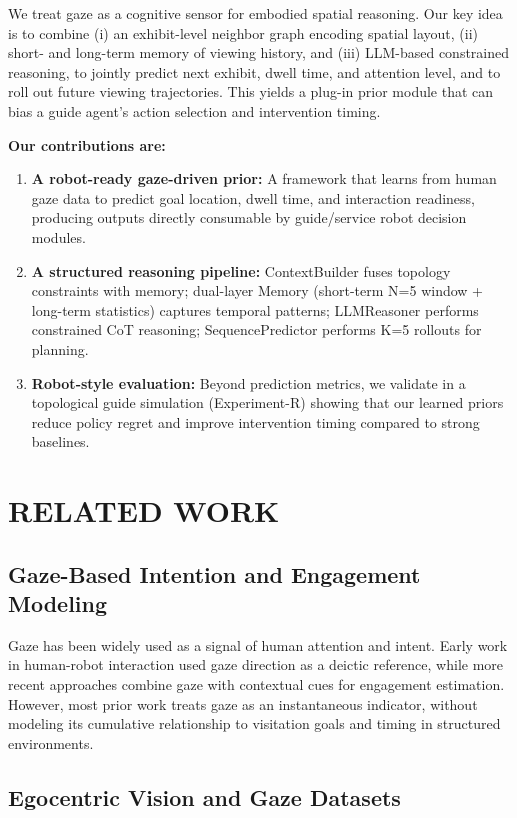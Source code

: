 \documentclass[letterpaper]{article}
\begin{document}
We treat gaze as a cognitive sensor for embodied spatial reasoning. Our key idea is to combine (i) an exhibit-level neighbor graph encoding spatial layout, (ii) short- and long-term memory of viewing history, and (iii) LLM-based constrained reasoning, to jointly predict next exhibit, dwell time, and attention level, and to roll out future viewing trajectories. This yields a plug-in prior module that can bias a guide agent's action selection and intervention timing.

\textbf{Our contributions are:}

\begin{enumerate}
    \item \textbf{A robot-ready gaze-driven prior:} A framework that learns from human gaze data to predict goal location, dwell time, and interaction readiness, producing outputs directly consumable by guide/service robot decision modules.
    \item \textbf{A structured reasoning pipeline:} ContextBuilder fuses topology constraints with memory; dual-layer Memory (short-term N=5 window + long-term statistics) captures temporal patterns; LLMReasoner performs constrained CoT reasoning; SequencePredictor performs K=5 rollouts for planning.
    \item \textbf{Robot-style evaluation:} Beyond prediction metrics, we validate in a topological guide simulation (Experiment-R) showing that our learned priors reduce policy regret and improve intervention timing compared to strong baselines.
\end{enumerate}

\section{RELATED WORK}

\subsection{Gaze-Based Intention and Engagement Modeling}

Gaze has been widely used as a signal of human attention and intent. Early work in human-robot interaction used gaze direction as a deictic reference, while more recent approaches combine gaze with contextual cues for engagement estimation. However, most prior work treats gaze as an instantaneous indicator, without modeling its cumulative relationship to visitation goals and timing in structured environments.

\subsection{Egocentric Vision and Gaze Datasets}
\end{document}
